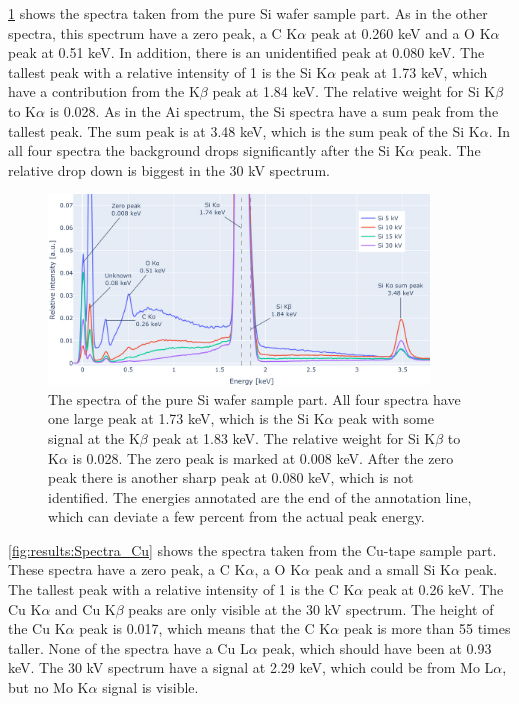 \cref{fig:results:Spectra_Si} shows the spectra taken from the pure Si wafer sample part.
As in the other spectra, this spectrum have a zero peak, a C K$\alpha$ peak at 0.260 keV and a O K$\alpha$ peak at 0.51 keV.
In addition, there is an unidentified peak at 0.080 keV.
The tallest peak with a relative intensity of 1 is the Si K$\alpha$ peak at 1.73 keV, which have a contribution from the K$\beta$ peak at 1.84 keV.
The relative weight for Si K$\beta$ to K$\alpha$ is 0.028.
As in the Ai spectrum, the Si spectra have a sum peak from the tallest peak.
The sum peak is at 3.48 keV, which is the sum peak of the Si K$\alpha$.
In all four spectra the background drops significantly after the Si K$\alpha$ peak.
The relative drop down is biggest in the 30 kV spectrum.

\begin{figure}[h]
    \centering
    \includegraphics[width=0.90\textwidth]{figures/each_spectra/Si_everything.png}
    \caption{
        The spectra of the pure Si wafer sample part.
        All four spectra have one large peak at 1.73 keV, which is the Si K$\alpha$ peak with some signal at the K$\beta$ peak at 1.83 keV.
        The relative weight for Si K$\beta$ to K$\alpha$ is 0.028.
        The zero peak is marked at 0.008 keV.
        After the zero peak there is another sharp peak at 0.080 keV, which is not identified.
        The energies annotated are the end of the annotation line, which can deviate a few percent from the actual peak energy.
    }
    \label{fig:results:Spectra_Si}
\end{figure}


\cref{fig:results:Spectra_Cu} shows the spectra taken from the Cu-tape sample part.
These spectra have a zero peak, a C K$\alpha$, a O K$\alpha$ peak and a small Si K$\alpha$ peak.
The tallest peak with a relative intensity of 1 is the C K$\alpha$ peak at 0.26 keV.
The Cu K$\alpha$ and Cu K$\beta$ peaks are only visible at the 30 kV spectrum.
The height of the Cu K$\alpha$ peak is 0.017, which means that the C K$\alpha$ peak is more than 55 times taller.
None of the spectra have a Cu L$\alpha$ peak, which should have been at 0.93 keV.
The 30 kV spectrum have a signal at 2.29 keV, which could be from Mo L$\alpha$, but no Mo K$\alpha$ signal is visible.

